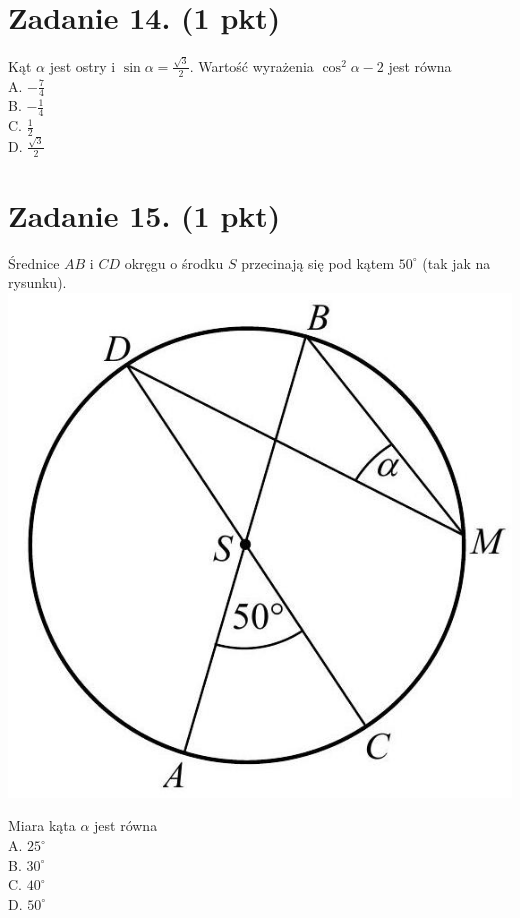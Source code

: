 \documentclass[10pt]{article}
\begin{document}
\section*{Zadanie 14. (1 pkt)}
Kąt \(\alpha\) jest ostry i \(\sin \alpha=\frac{\sqrt{3}}{2}\). Wartość wyrażenia \(\cos ^{2} \alpha-2\) jest równa\\
A. \(-\frac{7}{4}\)\\
B. \(-\frac{1}{4}\)\\
C. \(\frac{1}{2}\)\\
D. \(\frac{\sqrt{3}}{2}\)

\section*{Zadanie 15. (1 pkt)}
Średnice \(A B\) i \(C D\) okręgu o środku \(S\) przecinają się pod kątem \(50^{\circ}\) (tak jak na rysunku).\\
\includegraphics[max width=\textwidth, center]{2024_11_21_e0e8aab895018a50a9a7g-06}

Miara kąta \(\alpha\) jest równa\\
A. \(25^{\circ}\)\\
B. \(30^{\circ}\)\\
C. \(40^{\circ}\)\\
D. \(50^{\circ}\)
\end{document}
